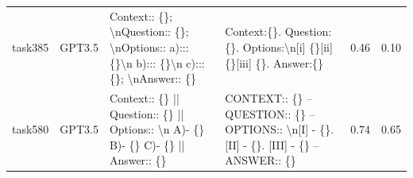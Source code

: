 \begin{longtable}{@{}p{0.8cm\tiny}p{1cm\tiny}p{4.1cm\ttfamily\tiny}p{4.1cm\ttfamily\tiny}p{0.8cm\tiny}p{0.8cm\tiny}@{}}
task385   & GPT3.5    & Context:: \{\}; \textbackslash{}nQuestion:: \{\}; \textbackslash{}nOptions::  a)::: \{\}\textbackslash{}n b)::: \{\}\textbackslash{}n c)::: \{\}; \textbackslash{}nAnswer:: \{\}                                                                                                                                                                                                                                                                                                                                        & Context:\{\}. Question:\{\}. Options:\textbackslash{}n{[}i{]} \{\}{[}ii{]} \{\}{[}iii{]} \{\}. Answer:\{\}                                                                                                                                                                                                                                                                                                                                                                                                                                                                        & 0.46 & 0.10 \\
task580   & GPT3.5    & Context:: \{\} || Question:: \{\} || Options::  \textbackslash{}n A)- \{\}  B)- \{\}  C)- \{\} || Answer:: \{\}                                                                                                                                                                                                                                                                                                                                                                                                         & CONTEXT:: \{\} -- QUESTION:: \{\} -- OPTIONS::  \textbackslash{}n{[}I{]} - \{\}. {[}II{]} - \{\}. {[}III{]} - \{\} -- ANSWER:: \{\}                                                                                                                                                                                                                                                                                                                                                                                                                                               & 0.74 & 0.65 \\

\end{longtable}
